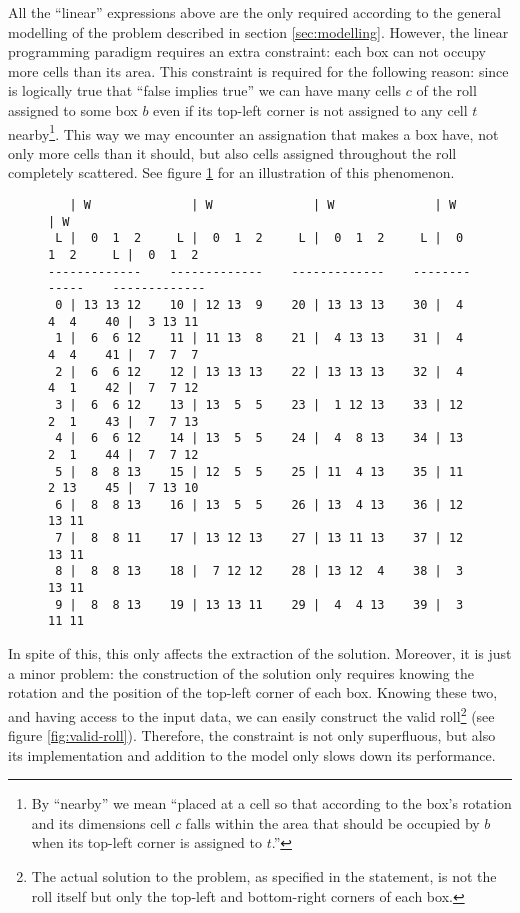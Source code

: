 All the ``linear'' expressions above are the only required according to the
general modelling of the problem described in section \ref{sec:modelling}. However,
the linear programming paradigm requires an extra constraint: each box can not
occupy more cells than its area. This constraint is required for the following
reason: since is logically true that ``false implies true'' we can have many
cells $c$ of the roll assigned to some box $b$ even if its top-left corner is not
assigned to any cell $t$ nearby\footnote{By ``nearby'' we mean ``placed at a cell so that
according to the box's rotation and its dimensions cell $c$ falls within the
area that should be occupied by $b$ when its top-left corner is assigned to $t$.''}.
This way we may encounter an assignation that makes a box have, not only more cells
than it should, but also cells assigned throughout the roll completely scattered.
See figure \ref{fig:invalid-roll} for an illustration of this phenomenon.

\begin{figure}[H]
\centering
{\scriptsize
\begin{BVerbatim}
   | W              | W              | W              | W              | W           
 L |  0  1  2     L |  0  1  2     L |  0  1  2     L |  0  1  2     L |  0  1  2
-------------    -------------    -------------    -------------    -------------
 0 | 13 13 12    10 | 12 13  9    20 | 13 13 13    30 |  4  4  4    40 |  3 13 11 
 1 |  6  6 12    11 | 11 13  8    21 |  4 13 13    31 |  4  4  4    41 |  7  7  7 
 2 |  6  6 12    12 | 13 13 13    22 | 13 13 13    32 |  4  4  1    42 |  7  7 12 
 3 |  6  6 12    13 | 13  5  5    23 |  1 12 13    33 | 12  2  1    43 |  7  7 13 
 4 |  6  6 12    14 | 13  5  5    24 |  4  8 13    34 | 13  2  1    44 |  7  7 12 
 5 |  8  8 13    15 | 12  5  5    25 | 11  4 13    35 | 11  2 13    45 |  7 13 10 
 6 |  8  8 13    16 | 13  5  5    26 | 13  4 13    36 | 12 13 11 
 7 |  8  8 11    17 | 13 12 13    27 | 13 11 13    37 | 12 13 11 
 8 |  8  8 13    18 |  7 12 12    28 | 13 12  4    38 |  3 13 11 
 9 |  8  8 13    19 | 13 13 11    29 |  4  4 13    39 |  3 11 11 
\end{BVerbatim}
}
\label{fig:invalid-roll}
\end{figure}

In spite of this, this only affects the extraction of the solution. Moreover, it 
is just a minor problem: the construction of the solution only requires knowing the
rotation and the position of the top-left corner of each box. Knowing these two,
and having access to the input data, we can easily construct the valid roll\footnote{The
actual solution to the problem, as specified in the statement, is not the roll
itself but only the top-left and bottom-right corners of each box.}
(see figure \ref{fig:valid-roll}). Therefore, the constraint is not only superfluous,
but also its implementation and addition to the model only slows down its performance.

